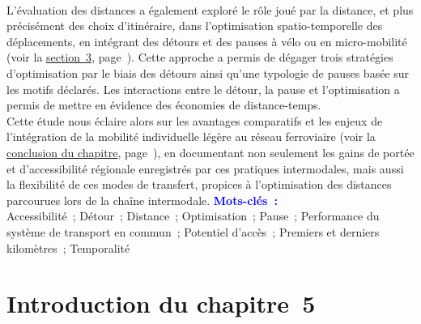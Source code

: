 \begin{refsegment}
\begin{tcolorbox}
{    \\
L'évaluation des distances a également exploré le rôle joué par la distance, et plus précisément des choix d'itinéraire, dans l'optimisation spatio-temporelle des déplacements, en intégrant des détours et des pauses à vélo ou en micro-mobilité (voir la \hyperref[chap5:detours-pauses-optimisation]{section~3}, page~\pageref{chap5:detours-pauses-optimisation}). Cette approche a permis de dégager trois stratégies d'optimisation par le biais des détours ainsi qu'une typologie de pauses basée sur les motifs déclarés. Les interactions entre le détour, la pause et l'optimisation a permis de mettre en évidence des économies de distance-temps.%
    \\
Cette étude nous éclaire alors sur les avantages comparatifs et les enjeux de l'intégration de la mobilité individuelle légère au réseau ferroviaire (voir la \hyperref[chap5:conclusion]{conclusion du chapitre}, page~\pageref{chap5:conclusion}), en documentant non seulement les gains de portée et d'accessibilité régionale enregistrés par ces pratiques intermodales, mais aussi la flexibilité de ces modes de transfert, propices à l'optimisation des distances parcourues lors de la chaîne intermodale.%
    }
    \tcblower
\Large{\textcolor{blue}{\textbf{Mots-clés~:}}}
    \\
    \small{
Accessibilité~;
Détour~;
Distance~;
Optimisation~;
Pause~;
Performance du système de transport en commun~;
Potentiel d'accès~;
Premiers et derniers kilomètres~;
Temporalité
    }
    \end{tcolorbox}

    \newpage
\section*{Introduction du chapitre~5
    \label{chap5:introduction}
    }

    \begin{displayquote}


\end{displayquote}
\end{refsegment}

